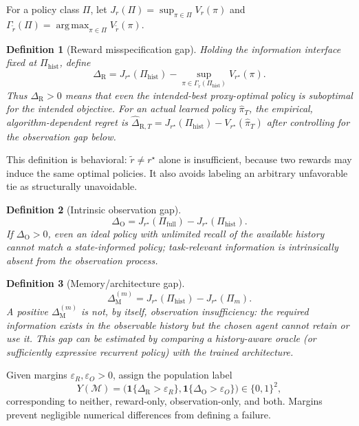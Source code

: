 \documentclass[9pt,twocolumn]{extarticle}
\newtheorem{definition}{Definition}
\newcommand{\argmax}{\operatorname*{arg\,max}}
\newcommand{\ind}{\mathbf{1}}
\newcommand{\rtrue}{r^{\star}}
\newcommand{\rproxy}{\widetilde r}
\newcommand{\PiFull}{\Pi_{\mathrm{full}}}
\newcommand{\PiHist}{\Pi_{\mathrm{hist}}}
\newcommand{\PiMem}{\Pi_{m}}
\begin{document}
For a policy class $\Pi$, let
$J_r(\Pi)=\sup_{\pi\in\Pi}V_r(\pi)$ and
$\Gamma_{\widetilde r}(\Pi)=\argmax_{\pi\in\Pi}V_{\widetilde r}(\pi)$.

\begin{definition}[Reward misspecification gap]
Holding the information interface fixed at $\PiHist$, define
\begin{equation}
\Delta_{\mathrm R}=
J_{\rtrue}(\PiHist)-
\sup_{\pi\in\Gamma_{\widetilde r}(\PiHist)}V_{\rtrue}(\pi).
\label{eq:reward-gap}
\end{equation}
Thus $\Delta_{\mathrm R}>0$ means that even the intended-best proxy-optimal
policy is suboptimal for the intended objective. For an actual learned policy
$\widehat\pi_T$, the empirical, algorithm-dependent regret is
$\widehat\Delta_{\mathrm R,T}=J_{\rtrue}(\PiHist)-
V_{\rtrue}(\widehat\pi_T)$ after controlling for the observation gap below.
\end{definition}

This definition is behavioral: $\rproxy\neq\rtrue$ alone is insufficient,
because two rewards may induce the same optimal policies. It also avoids
labeling an arbitrary unfavorable tie as structurally unavoidable.

\begin{definition}[Intrinsic observation gap]
\begin{equation}
\Delta_{\mathrm O}=J_{\rtrue}(\PiFull)-J_{\rtrue}(\PiHist).
\label{eq:observation-gap}
\end{equation}
If $\Delta_{\mathrm O}>0$, even an ideal policy with unlimited recall of the
available history cannot match a state-informed policy; task-relevant
information is intrinsically absent from the observation process.
\end{definition}

\begin{definition}[Memory/architecture gap]
\begin{equation}
\Delta_{\mathrm M}^{(m)}=J_{\rtrue}(\PiHist)-J_{\rtrue}(\PiMem).
\label{eq:memory-gap}
\end{equation}
A positive $\Delta_{\mathrm M}^{(m)}$ is not, by itself, observation
insufficiency: the required information exists in the observable history but
the chosen agent cannot retain or use it. This gap can be estimated by
comparing a history-aware oracle (or sufficiently expressive recurrent policy)
with the trained architecture.
\end{definition}

Given margins $\varepsilon_R,\varepsilon_O>0$, assign the population label
\begin{equation}
Y(\mathcal M)=
\big(\ind\{\Delta_{\mathrm R}>\varepsilon_R\},
     \ind\{\Delta_{\mathrm O}>\varepsilon_O\}\big)
\in\{0,1\}^2,
\end{equation}
corresponding to neither, reward-only, observation-only, and both. Margins
prevent negligible numerical differences from defining a failure.
\end{document}
